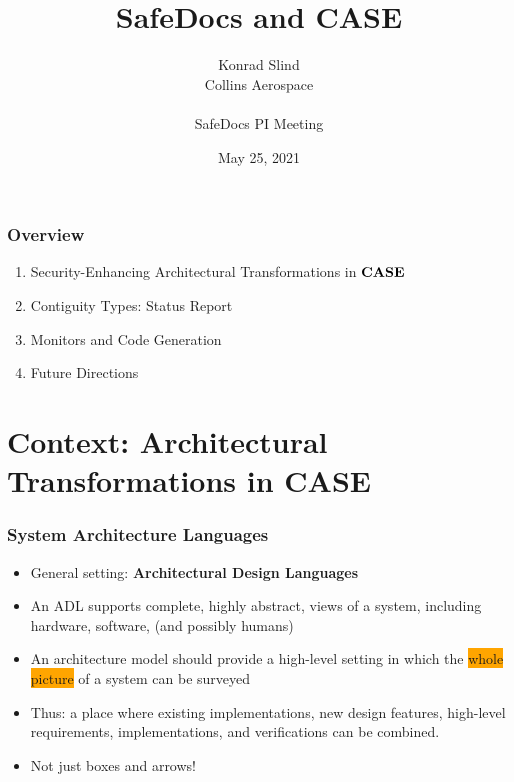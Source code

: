 \documentclass{beamer}
\newcommand{\kemph}[1]{\colorbox{orange}{#1}}
\newcommand{\konst}[1]{\ensuremath{\mbox{\bf{#1}}}}
\begin{document}

\author{Konrad Slind \\ Collins Aerospace \\ \\ SafeDocs PI Meeting}
\date{May 25, 2021}
\title{SafeDocs and CASE}
\maketitle

\begin{frame}\frametitle{Overview}

\begin{enumerate}
\item Security-Enhancing Architectural Transformations in \konst{CASE}
\item Contiguity Types: Status Report
\item Monitors and Code Generation
\item Future Directions
\end{enumerate}
\end{frame}


\section {Context: Architectural Transformations in CASE}

\begin{frame}\frametitle{System Architecture Languages}
\begin{itemize}

\item General setting: \textbf{Architectural Design Languages}

\item An ADL supports complete, highly abstract, views of a system,
  including hardware, software, (and possibly humans)

\item An architecture model should provide a high-level setting in which
  the \kemph{whole picture} of a system can be surveyed

\item Thus: a place where existing implementations, new design
  features, high-level requirements, implementations, and
  verifications can be combined.

\item Not just boxes and arrows!

\end{itemize}

\end{frame}
\end{document}

